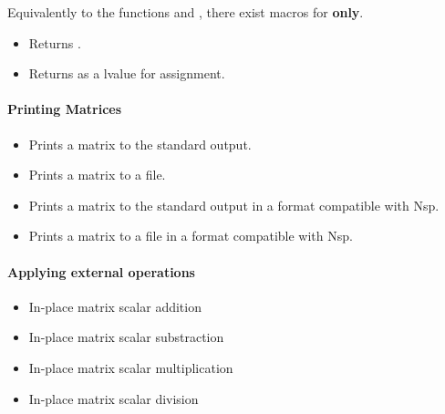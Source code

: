 Equivalently to the functions  and ,
there exist macros for {\bf {} only}.
\begin{itemize}
\item {}
  \sshortdescribe Returns .
  
\item {}
  \sshortdescribe Returns  as a lvalue for assignment.
\end{itemize}


\paragraph{Printing Matrices}

\begin{itemize}
\item {}
  \sshortdescribe Prints a matrix to the standard output.  

\item {}
  \sshortdescribe Prints a matrix to a file.

\item {}
  \sshortdescribe Prints a matrix to the standard output in a format
  compatible with Nsp.  

\item {}
  \sshortdescribe Prints a matrix to a file in a format compatible with Nsp.
\end{itemize}

\paragraph{Applying external operations}
\begin{itemize}
\item {}
  \sshortdescribe In-place matrix scalar addition  

\item {}
  \sshortdescribe In-place matrix scalar substraction  

\item {}
  \sshortdescribe In-place matrix scalar multiplication  

\item {}
  \sshortdescribe In-place matrix scalar division  

\end{itemize}

